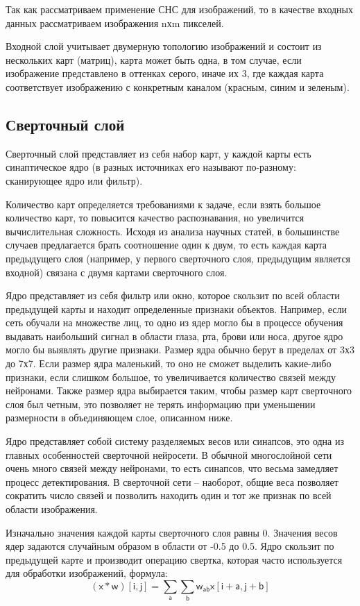 \documentclass[11pt,colorlinks=true]{article}
\begin{document}
Так как рассматриваем применение СНС для изображений, то в качестве входных данных рассматриваем  изображения nхm пикселей.

Входной слой учитывает двумерную топологию изображений и состоит из нескольких карт (матриц), карта может быть одна, в том случае, если изображение представлено в оттенках серого, иначе их 3, где каждая карта соответствует изображению с конкретным каналом (красным, синим и зеленым).

\subsection{Сверточный слой}

Сверточный слой представляет из себя набор карт, у каждой карты есть синаптическое ядро (в разных источниках его называют по-разному: сканирующее ядро или фильтр). 

Количество карт определяется требованиями к задаче, если взять большое количество карт, то повысится качество распознавания, но увеличится вычислительная сложность. Исходя из анализа научных статей, в большинстве случаев предлагается брать соотношение один к двум, то есть каждая карта предыдущего слоя (например, у первого сверточного слоя, предыдущим является входной) связана с двумя картами сверточного слоя.

Ядро представляет из себя фильтр или окно, которое скользит по всей области предыдущей карты и находит определенные признаки объектов. Например, если сеть обучали на множестве лиц, то одно из ядер могло бы в процессе обучения выдавать наибольший сигнал в области глаза, рта, брови или носа, другое ядро могло бы выявлять другие признаки. Размер ядра обычно берут в пределах от 3х3 до 7х7. Если размер ядра маленький, то оно не сможет выделить какие-либо признаки, если слишком большое, то увеличивается количество связей между нейронами. Также размер ядра выбирается таким, чтобы размер карт сверточного слоя был четным, это позволяет не терять информацию при уменьшении размерности в объединяющем слое, описанном ниже. 

Ядро представляет собой систему разделяемых весов или синапсов, это одна из главных особенностей сверточной нейросети. В обычной многослойной сети очень много связей между нейронами, то есть синапсов, что весьма замедляет процесс детектирования. В сверточной сети – наоборот, общие веса позволяет сократить число связей и позволить находить один и тот же признак по всей области изображения.

Изначально значения каждой карты сверточного слоя равны 0. Значения весов ядер задаются случайным образом в области от -0.5 до 0.5. Ядро скользит по предыдущей карте и производит операцию свертка, которая часто используется для обработки изображений, формула:
\begin{equation*}
(\mathsf{x} * \mathsf{w})[\mathsf{i},\mathsf{j}] = \sum \limits_{\mathsf{a}} \sum \limits_{\mathsf{b}} \mathsf{w}_{\mathsf{ab}} \mathsf{x}[\mathsf{i} + \mathsf{a}, \mathsf{j} + \mathsf{b}]
\end{equation*}
\end{document}
